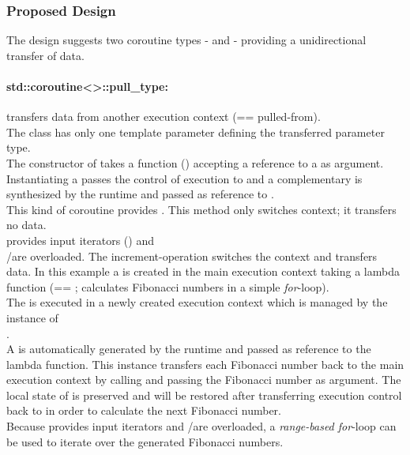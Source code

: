 
\subsubsection*{Proposed Design}
The design suggests two coroutine types - \pushcoro and \pullcoro - providing a
unidirectional transfer of data.

\paragraph*{std::coroutine<>::pull\_type:}
transfers data from another execution context (== pulled-from).\\
The class has only one template parameter defining the transferred parameter
type.\\
The constructor of \pullcoro takes a function (\corofunction) accepting a
reference to a \pushcoro as argument. Instantiating a \pullcoro passes the
control of execution to \corofunction and a complementary \pushcoro is
synthesized by the runtime and passed as reference to \corofunction.\\
\newline
This kind of coroutine provides \pullcoroop. This method only switches
context; it transfers no data.\\
\newline
\pullcoro provides input iterators (\pullcoroiterator) and\\
\bgin/\ed are overloaded. The increment-operation switches the context and
transfers data.
In this example a \pullcoro is created in the main execution context taking a
lambda function (== \corofunction; calculates Fibonacci numbers in a simple
\textit{for}-loop).\\
The \corofunction is executed in a newly created execution context which is
managed by the instance of\\
\pullcoro.\\
A \pushcoro is automatically generated by the runtime and passed as reference
to the lambda function. This \pushcoro instance transfers each Fibonacci number
back to the main execution context by calling \pushcoroop and passing the
Fibonacci number as argument. The local state of \corofunction is preserved and
will be restored after transferring execution control back to \corofunction in
order to calculate the next Fibonacci number.\\
Because \pullcoro provides input iterators and \bgin/\ed are overloaded, a
\textit{range-based for}-loop can be used to iterate over the generated
Fibonacci numbers.

